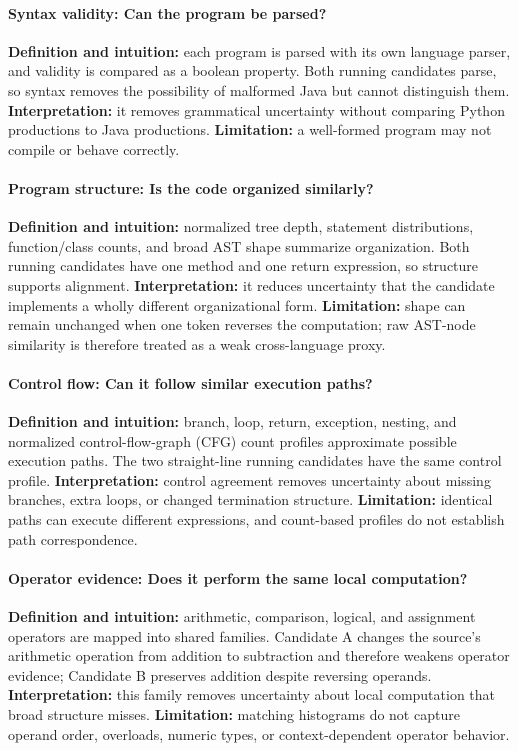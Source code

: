﻿\documentclass[conference]{IEEEtran}
\begin{document}
\paragraph{Syntax validity: Can the program be parsed?}
\textbf{Definition and intuition:} each program is parsed with its own language parser, and validity is compared as a boolean property. Both running candidates parse, so syntax removes the possibility of malformed Java but cannot distinguish them. \textbf{Interpretation:} it removes grammatical uncertainty without comparing Python productions to Java productions. \textbf{Limitation:} a well-formed program may not compile or behave correctly.

\paragraph{Program structure: Is the code organized similarly?}
\textbf{Definition and intuition:} normalized tree depth, statement distributions, function/class counts, and broad AST shape summarize organization. Both running candidates have one method and one return expression, so structure supports alignment. \textbf{Interpretation:} it reduces uncertainty that the candidate implements a wholly different organizational form. \textbf{Limitation:} shape can remain unchanged when one token reverses the computation; raw AST-node similarity is therefore treated as a weak cross-language proxy.

\paragraph{Control flow: Can it follow similar execution paths?}
\textbf{Definition and intuition:} branch, loop, return, exception, nesting, and normalized control-flow-graph (CFG) count profiles approximate possible execution paths. The two straight-line running candidates have the same control profile. \textbf{Interpretation:} control agreement removes uncertainty about missing branches, extra loops, or changed termination structure. \textbf{Limitation:} identical paths can execute different expressions, and count-based profiles do not establish path correspondence.

\paragraph{Operator evidence: Does it perform the same local computation?}
\textbf{Definition and intuition:} arithmetic, comparison, logical, and assignment operators are mapped into shared families. Candidate A changes the source's arithmetic operation from addition to subtraction and therefore weakens operator evidence; Candidate B preserves addition despite reversing operands. \textbf{Interpretation:} this family removes uncertainty about local computation that broad structure misses. \textbf{Limitation:} matching histograms do not capture operand order, overloads, numeric types, or context-dependent operator behavior.
\end{document}

